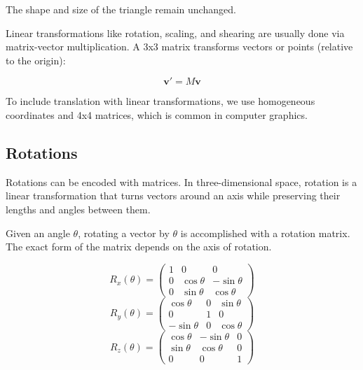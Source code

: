 The shape and size of the triangle remain unchanged.

Linear transformations like rotation, scaling, and shearing are usually done via matrix-vector multiplication. A 3x3 matrix transforms vectors or points (relative to the origin):

\begin{equation}
    \mathbf{v}' = M\mathbf{v}
\end{equation}

To include translation with linear transformations, we use homogeneous coordinates and 4x4 matrices, which is common in computer graphics.

\subsection{Rotations}

Rotations can be encoded with matrices. In three-dimensional space, rotation is a linear transformation that turns vectors around an axis while preserving their lengths and angles between them.

Given an angle $\theta$, rotating a vector by $\theta$ is accomplished with a rotation matrix. The exact form of the matrix depends on the axis of rotation.

\begin{equation}
    R_x(\theta) =
    \begin{pmatrix}
        1 & 0          & 0           \\
        0 & \cos\theta & -\sin\theta \\
        0 & \sin\theta & \cos\theta
    \end{pmatrix}
\end{equation}
\begin{equation}
    R_y(\theta) =
    \begin{pmatrix}
        \cos\theta  & 0 & \sin\theta \\
        0           & 1 & 0          \\
        -\sin\theta & 0 & \cos\theta
    \end{pmatrix}
\end{equation}
\begin{equation}
    R_z(\theta) =
    \begin{pmatrix}
        \cos\theta & -\sin\theta & 0 \\
        \sin\theta & \cos\theta  & 0 \\
        0          & 0           & 1
    \end{pmatrix}
\end{equation}

